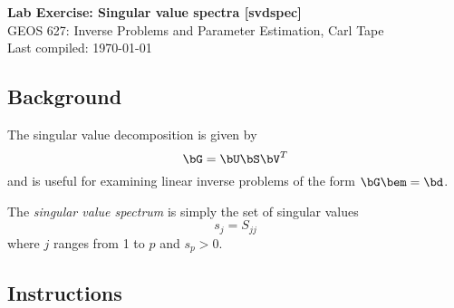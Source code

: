\documentclass[11pt,titlepage,fleqn]{article}
\begin{document}

\begin{spacing}{1.2}
\centering
{\large \bf Lab Exercise: Singular value spectra [svdspec]} \\
GEOS 627: Inverse Problems and Parameter Estimation, Carl Tape \\
Last compiled: \today
\end{spacing}


\subsection*{Background}

The singular value decomposition is given by
%
\begin{equation*}
\bG = \bU\bS\bV^T
\end{equation*}
%
and is useful for examining linear inverse problems of the form $\bG\bem = \bd$.

The {\em singular value spectrum} is simply the set of singular values
%
\begin{equation*}
s_j = S_{jj}
\end{equation*}
%
where $j$ ranges from 1 to $p$ and $s_p > 0$.


\subsection*{Instructions}
\end{document}
